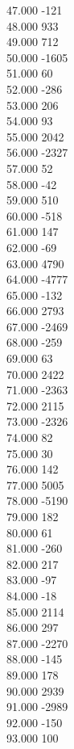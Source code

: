 { 47.000	-121 \\
 48.000	933 \\
 49.000	712 \\
 50.000	-1605 \\
 51.000	60 \\
 52.000	-286 \\
 53.000	206 \\
 54.000	93 \\
 55.000	2042 \\
 56.000	-2327 \\
 57.000	52 \\
 58.000	-42 \\
 59.000	510 \\
 60.000	-518 \\
 61.000	147 \\
 62.000	-69 \\
 63.000	4790 \\
 64.000	-4777 \\
 65.000	-132 \\
 66.000	2793 \\
 67.000	-2469 \\
 68.000	-259 \\
 69.000	63 \\
 70.000	2422 \\
 71.000	-2363 \\
 72.000	2115 \\
 73.000	-2326 \\
 74.000	82 \\
 75.000	30 \\
 76.000	142 \\
 77.000	5005 \\
 78.000	-5190 \\
 79.000	182 \\
 80.000	61 \\
 81.000	-260 \\
 82.000	217 \\
 83.000	-97 \\
 84.000	-18 \\
 85.000	2114 \\
 86.000	297 \\
 87.000	-2270 \\
 88.000	-145 \\
 89.000	178 \\
 90.000	2939 \\
 91.000	-2989 \\
 92.000	-150 \\
 93.000	100 \\
}
